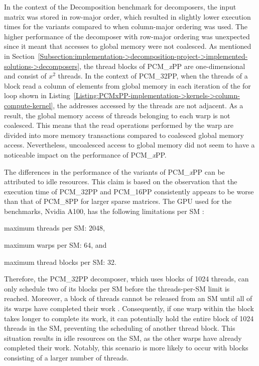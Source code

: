 In the context of the Decomposition benchmark for decomposers, the input matrix was stored in row-major order, which resulted in slightly lower execution times for the variants compared to when column-major ordering was used.
The higher performance of the decomposer with row-major ordering was unexpected since it meant that accesses to global memory were not coalesced.
As mentioned in Section~\ref{Subsection:implementation->decomposition-project->implemented-solutions->decomposers}, the thread blocks of PCM\_\textit{x}PP are one-dimensional and consist of $x^2$ threads.
In the context of PCM\_32PP, when the threads of a block read a column of elements from global memory in each iteration of the for loop shown in Listing~\ref{Listing:PCMxPP-implementation->kernels->column-compute-kernel}, the addresses accessed by the threads are not adjacent.
As a result, the global memory access of threads belonging to each warp is not coalesced.
This means that the read operations performed by the warp are divided into more memory transactions compared to coalesced global memory access.
Nevertheless, uncoalesced access to global memory did not seem to have a noticeable impact on the performance of PCM\_\textit{x}PP.

The differences in the performance of the variants of PCM\_\textit{x}PP can be attributed to idle resources.
This claim is based on the observation that the execution time of PCM\_32PP and PCM\_16PP consistently appears to be worse than that of PCM\_8PP for larger sparse matrices.
The GPU used for the benchmarks, Nvidia A100, has the following limitations per SM \cite{rfiOEXAGDlcAOxF3}:
%
\begin{tight_enumerate}
	\item maximum threads per SM: 2048,
	\item maximum warps per SM: 64, and
	\item maximum thread blocks per SM: 32.
\end{tight_enumerate}
%
Therefore, the PCM\_32PP decomposer, which uses blocks of 1024 threads, can only schedule two of its blocks per SM before the threads-per-SM limit is reached.
Moreover, a block of threads cannot be released from an SM until all of its warps have completed their work \cite{Cheng2014}.
Consequently, if one warp within the block takes longer to complete its work, it can potentially hold the entire block of 1024 threads in the SM, preventing the scheduling of another thread block.
This situation results in idle resources on the SM, as the other warps have already completed their work.
Notably, this scenario is more likely to occur with blocks consisting of a larger number of threads.

